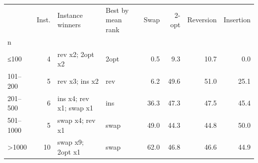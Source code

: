 \begin{tabular}{lrllrrrr}
\toprule
 & Inst. & Instance winners & Best by mean rank & Swap & 2-opt & Reversion & Insertion \\
n &  &  &  &  &  &  &  \\
\midrule
≤100 & 4 & rev x2; 2opt x2 & 2opt & 0.5 & 9.3 & 10.7 & 0.0 \\
101–200 & 5 & rev x3; ins x2 & rev & 6.2 & 49.6 & 51.0 & 25.1 \\
201–500 & 6 & ins x4; rev x1; swap x1 & ins & 36.3 & 47.3 & 47.5 & 45.4 \\
501–1000 & 5 & swap x4; rev x1 & swap & 49.0 & 44.3 & 44.8 & 50.0 \\
>1000 & 10 & swap x9; 2opt x1 & swap & 62.0 & 46.8 & 46.6 & 44.9 \\
\bottomrule
\end{tabular}
